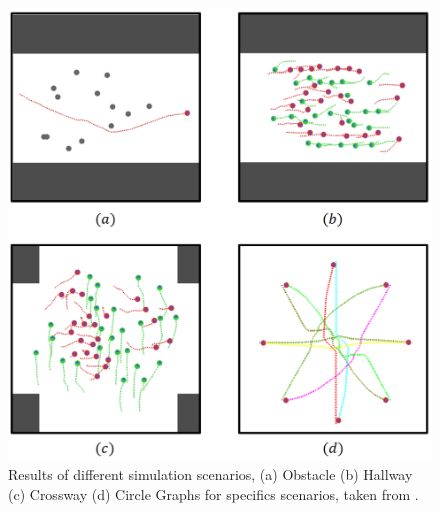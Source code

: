 \documentclass{acmsiggraph}               %
\begin{document}
\begin{figure}
  \centering
  \includegraphics[width=1\linewidth]{images/aiSituations.png}
  \caption{Results of different simulation scenarios, (a) Obstacle (b) Hallway (c) Crossway (d) Circle  Graphs for specifics scenarios, taken from \protect\cite{lee_crowd_2018}.}
  \label{fig:aiScenarios}
\end{figure}


\nocite{*}

\end{document}
